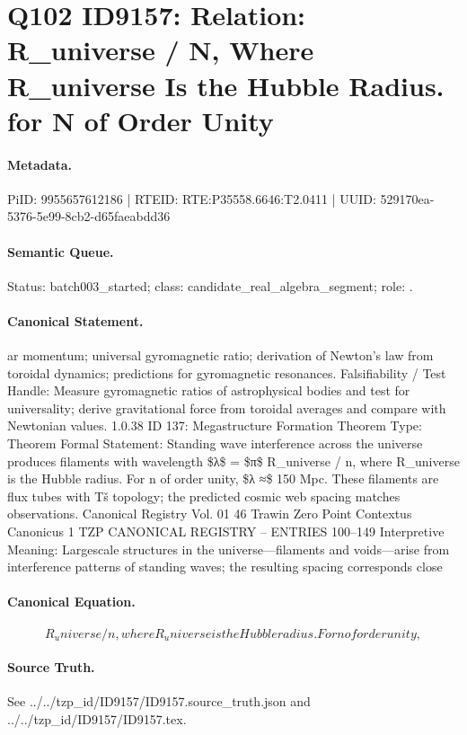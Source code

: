 \section*{Q102 ID9157: Relation: R\_universe / N, Where R\_universe Is the Hubble Radius. for N of Order Unity}
\paragraph{Metadata.}
PiID: 9955657612186 | RTEID: RTE:P35558.6646:T2.0411 | UUID: 529170ea-5376-5e99-8cb2-d65faeabdd36

\paragraph{Semantic Queue.}
Status: batch003\_started; class: candidate\_real\_algebra\_segment; role: .

\paragraph{Canonical Statement.}
ar momentum; universal gyromagnetic ratio; derivation of Newton’s law from toroidal dynamics; predictions for gyromagnetic resonances. Falsifiability / Test Handle: Measure gyromagnetic ratios of astrophysical bodies and test for universality; derive gravitational force from toroidal averages and compare with Newtonian values. 1.0.38 ID 137: Megastructure Formation Theorem Type: Theorem Formal Statement: Standing wave interference across the universe produces filaments with wavelength \$λ\$ = \$π\$ R\_universe / n, where R\_universe is the Hubble radius. For n of order unity, \$λ ≈\$ 150 Mpc. These filaments are flux tubes with Tš topology; the predicted cosmic web spacing matches observations. Canonical Registry Vol. 01 46 Trawin Zero Point Contextus Canonicus 1 TZP CANONICAL REGISTRY – ENTRIES 100–149 Interpretive Meaning: Largescale structures in the universe—filaments and voids—arise from interference patterns of standing waves; the resulting spacing corresponds close

\paragraph{Canonical Equation.}
\[
R_universe / n, where R_universe is the Hubble radius. For n of order unity,
\]

\paragraph{Source Truth.}
See ../../tzp\_id/ID9157/ID9157.source\_truth.json and ../../tzp\_id/ID9157/ID9157.tex.
